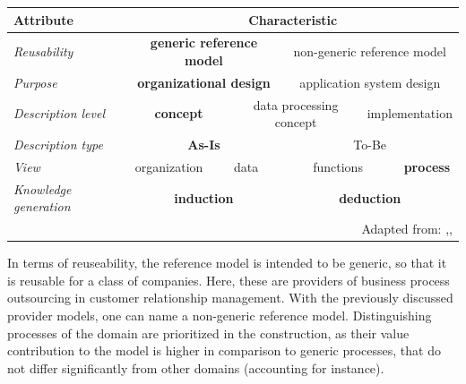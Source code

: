 \begin{table}[caption={Reference model requirements }, label=tab:morph]
	\centering
		\begin{tabular}{ 
				p{3.1cm}  
			p{2cm} p{2cm} p{2cm} p{2cm} p{2cm} p{2cm} p{2cm} p{2cm} p{2cm} p{2cm} p{2cm} p{2cm}    }
			Attribute                                   & \multicolumn{12}{c}{ Characteristic }                                                                                                                  \\ \hline
			\multicolumn{1}{|l|}{\textit{Reusability}}          & \multicolumn{6}{c|}{\textbf{generic reference model}}                       & \multicolumn{6}{c|}{non-generic reference model}                  \\ \hline
			\multicolumn{1}{|l|}{\textit{Purpose}}              & \multicolumn{6}{c|}{\textbf{organizational design}}                         & \multicolumn{6}{c|}{application system design}                    \\ \hline
			\multicolumn{1}{|l|}{\textit{Description level}}    & \multicolumn{4}{c|}{\textbf{concept}}                & \multicolumn{4}{c|}{data processing concept} & \multicolumn{4}{c|}{implementation}       \\ \hline
			\multicolumn{1}{|l|}{\textit{Description type}}     & \multicolumn{6}{c|}{\textbf{As-Is}}                  & \multicolumn{6}{c|}{To-Be}                             \\ \hline
			\multicolumn{1}{|l|}{\textit{View}}                 & \multicolumn{3}{c|}{organization} & \multicolumn{3}{c|}{data}    & \multicolumn{3}{c|}{functions}   & \multicolumn{3}{c|}{\textbf{process}} \\ \hline
			\multicolumn{1}{|l|}{\textit{Knowledge generation}} & \multicolumn{6}{c|}{\textbf{induction}}                                     & \multicolumn{6}{c|}{\textbf{deduction}}                                    \\ \hline 
			\multicolumn{13}{r}{Adapted from: \citep[\p{63}]{Puster2015},\citep[\p{98}]{brocke2003referenzmodellierung}, \citep[\p{248}]{thomas2006mang}  }       
			
	\end{tabular}
\end{table}

In terms of reuseability, the reference model is intended to be generic, so that it is reusable for a class of companies. Here, these are providers of business process outsourcing in customer relationship management. With the previously discussed provider models, one can name a non-generic reference model. Distinguishing processes of the domain are prioritized in the construction, as their value contribution to the model is higher in comparison to generic processes, that do not differ significantly from other domains (accounting for instance).  

